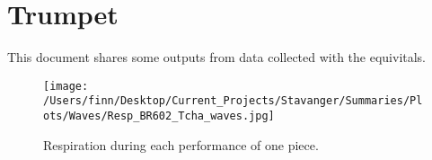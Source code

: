 \section{Trumpet}
 
This document shares some outputs from data collected with the equivitals.
\begin{figure}
\texttt{[image: /Users/finn/Desktop/Current\_Projects/Stavanger/Summaries/Plots/Waves/Resp\_BR602\_Tcha\_waves.jpg]}
\caption{Respiration during each performance of one piece.}
\label{6Resp}
\end{figure}

